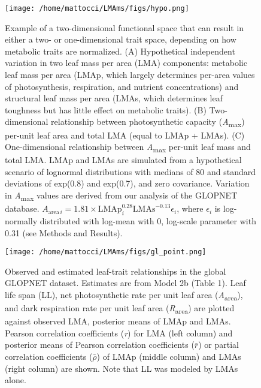 \documentclass[
  12pt,
  a4paper,
,tablecaptionabove
]{scrartcl}
\providecommand{\DIFaddtex}[1]{{\protect\color{blue}\uwave{#1}}} %
\providecommand{\DIFdeltex}[1]{{\protect\color{red}\sout{#1}}}                      %
\providecommand{\DIFdelend}{} %
\providecommand{\DIFaddFL}[1]{\DIFadd{#1}} %
\providecommand{\DIFdelFL}[1]{\DIFdel{#1}} %
\providecommand{\DIFaddbeginFL}{} %
\providecommand{\DIFaddendFL}{} %
\providecommand{\DIFdelbeginFL}{} %
\providecommand{\DIFdelendFL}{} %
\providecommand{\DIFadd}[1]{\texorpdfstring{\DIFaddtex{#1}}{#1}} %
\providecommand{\DIFdel}[1]{\texorpdfstring{\DIFdeltex{#1}}{}} %
\newcommand{\DIFscaledelfig}{0.5}
\newlength{\DIFdelgraphicswidth} %
\newlength{\DIFdelgraphicsheight} %
\newcommand{\DIFaddincludegraphics}[2][]{{\color{blue}\fbox{\DIFOincludegraphics[#1]{#2}}}} %
\newcommand{\DIFdelincludegraphics}[2][]{%
\sbox{\DIFdelgraphicsbox}{\DIFOincludegraphics[#1]{#2}}%
\settoboxwidth{\DIFdelgraphicswidth}{\DIFdelgraphicsbox} %
\settoboxtotalheight{\DIFdelgraphicsheight}{\DIFdelgraphicsbox} %
\scalebox{\DIFscaledelfig}{%
\parbox[b]{\DIFdelgraphicswidth}{\usebox{\DIFdelgraphicsbox}\\[-\baselineskip] \rule{\DIFdelgraphicswidth}{0em}}\llap{\resizebox{\DIFdelgraphicswidth}{\DIFdelgraphicsheight}{%
\setlength{\unitlength}{\DIFdelgraphicswidth}%
\begin{picture}(1,1)%
\thicklines\linethickness{2pt} %
{\color[rgb]{1,0,0}\put(0,0){\framebox(1,1){}}}%
{\color[rgb]{1,0,0}\put(0,0){\line( 1,1){1}}}%
{\color[rgb]{1,0,0}\put(0,1){\line(1,-1){1}}}%
\end{picture}%
}\hspace*{3pt}}} %
} %
\DeclareRobustCommand{\DIFdelend}{\DIFOaddend \let\includegraphics\DIFOincludegraphics} %
\DeclareRobustCommand{\DIFaddbeginFL}{\DIFOaddbeginFL \let\includegraphics\DIFaddincludegraphics} %
\DeclareRobustCommand{\DIFaddendFL}{\DIFOaddendFL \let\includegraphics\DIFOincludegraphics} %
\DeclareRobustCommand{\DIFdelbeginFL}{\DIFOdelbeginFL \let\includegraphics\DIFdelincludegraphics} %
\DeclareRobustCommand{\DIFdelendFL}{\DIFOaddendFL \let\includegraphics\DIFOincludegraphics} %
\begin{document}
\DIFdelend \begin{figure}

{\centering \texttt{[image: /home/mattocci/LMAms/figs/hypo.png]}

}

\caption{\label{fig-Hplt}Example of a two-dimensional functional space
that can result in either a two- or one-dimensional trait space,
depending on how metabolic traits are normalized. (A) Hypothetical
independent variation in two leaf mass per area (LMA) components:
metabolic leaf mass per area (LMAp, which largely determines per-area
values of photosynthesis, respiration, and nutrient concentrations) and
structural leaf mass per area (LMAs, which determines leaf toughness but
has little effect on metabolic traits). (B) Two-dimensional relationship
between photosynthetic capacity (\emph{A}\textsubscript{max}) per-unit
leaf area and total LMA (equal to LMAp + LMAs). (C) One-dimensional
relationship between \emph{A}\textsubscript{max} per-unit leaf mass and
total LMA. LMAp and LMAs are simulated from a hypothetical scenario of
lognormal distributions with medians of 80 and standard deviations of
exp(0.8) and exp(0.7), and zero covariance. Variation in
\emph{A}\textsubscript{max} values are derived from our analysis of the
GLOPNET database.
\DIFdelbeginFL \DIFdelFL{\(A_{\mathrm{area} \, i}=1.81 \times \mathrm{LMAp}_i^{0.28}\mathrm{LMAs}^{-0.13}\epsilon_i\)}\DIFdelendFL \DIFaddbeginFL \DIFaddFL{\(A_{\mathrm{area} \, i}=1.77 \times \mathrm{LMAp}_i^{0.28}\mathrm{LMAs}^{-0.13}\epsilon_i\)}\DIFaddendFL ,
where \(\epsilon_i\) is log-normally distributed with log-mean with 0,
log-scale parameter with 0.31 (see Methods and Results).}

\end{figure}

\begin{figure}

{\centering \texttt{[image: /home/mattocci/LMAms/figs/gl\_point.png]}

}

\caption{\label{fig-GLplt}Observed and estimated leaf-trait
relationships in the global GLOPNET dataset. Estimates are from Model 2b
(Table 1). Leaf life span (LL), net photosynthetic rate per unit leaf
area (\emph{A}\textsubscript{area}), and dark respiration rate per unit
leaf area (\emph{R}\textsubscript{area}) are plotted against observed
LMA, posterior means of LMAp and LMAs. Pearson correlation coefficients
(\emph{r}) for LMA (left column) and posterior means of Pearson
correlation coefficients (\(\bar{r}\)) or partial correlation
coefficients (\(\bar{\rho}\)) of LMAp (middle column) and LMAs (right
column) are shown. Note that LL was modeled by LMAs alone.}

\end{figure}
\end{document}
